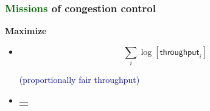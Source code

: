 \documentclass[svgnames]{beamer}
\begin{document}
\begin{frame}
\frametitle{\textbf{\textcolor{DarkGreen}{Missions}} of congestion control}

\textbf{Maximize}

\begin{itemize}

\item \begin{minipage}{3.75 cm}
\[\sum_i \log \left[ \textsf{throughput}_i \right]\]
\end{minipage} \textsf{\textcolor{DarkBlue}{(proportionally fair throughput)}}

\pause

\item
\begin{minipage}{3.75 cm}
\begin{tabular}{l}
\cellcolor{Bisque}\raisebox{0.75 cm}{\begin{minipage}{3.75 cm}
\[\sum_i \log \left[ \frac{\textsf{throughput}_i}{\visible<3->{
\textcolor{DarkBlue}{\big(}
}\textsf{delay}_i\visible<3->{
\textcolor{DarkBlue}{\big)^{\bm \delta}}}} \right]\]
\end{minipage} \textsf{\textcolor{DarkBlue}{(proportionally fair throughput/delay)}}}
\end{tabular}
\end{minipage}

\end{itemize}


\end{frame}
\end{document}
